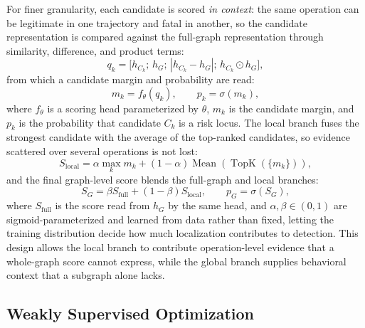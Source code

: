 For finer granularity, each candidate is scored \emph{in context}: the same operation can be legitimate in one trajectory and fatal in another, so the candidate representation is compared against the full-graph representation through similarity, difference, and product terms:
\begin{equation}
q_k=\big[h_{C_k};\,h_G;\,|h_{C_k}-h_G|;\,h_{C_k}\odot h_G\big],
\label{eq:qk}
\end{equation}
from which a candidate margin and probability are read:
\begin{equation}
m_k=f_\theta(q_k),\qquad p_k=\sigma(m_k),
\label{eq:mk}
\end{equation}
where $f_\theta$ is a scoring head parameterized by $\theta$, $m_k$ is the candidate margin, and $p_k$ is the probability that candidate $C_k$ is a risk locus. The local branch fuses the strongest candidate with the average of the top-ranked candidates, so evidence scattered over several operations is not lost:
\begin{equation}
S_{\mathrm{local}}=\alpha\max_k m_k+(1-\alpha)\operatorname{Mean}(\operatorname{TopK}(\{m_k\})),
\label{eq:slocal}
\end{equation}
and the final graph-level score blends the full-graph and local branches:
\begin{equation}
S_G=\beta S_{\mathrm{full}}+(1-\beta)S_{\mathrm{local}},\qquad p_G=\sigma(S_G),
\label{eq:sg}
\end{equation}
where $S_{\mathrm{full}}$ is the score read from $h_G$ by the same head, and $\alpha,\beta\in(0,1)$ are sigmoid-parameterized and learned from data rather than fixed, letting the training distribution decide how much localization contributes to detection. This design allows the local branch to contribute operation-level evidence that a whole-graph score cannot express, while the global branch supplies behavioral context that a subgraph alone lacks.

\subsection{Weakly Supervised Optimization}

